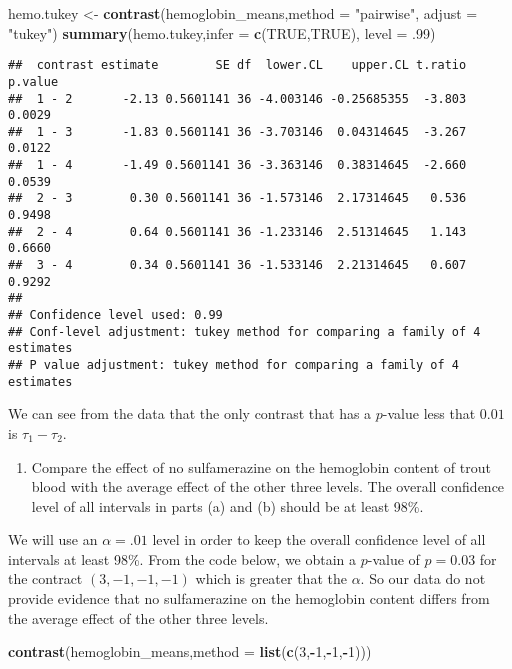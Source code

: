 \documentclass[12pt,]{article}
\newenvironment{Shaded}{\begin{snugshade}}{\end{snugshade}}
\newcommand{\KeywordTok}[1]{\textcolor[rgb]{0.13,0.29,0.53}{\textbf{#1}}}
\newcommand{\DataTypeTok}[1]{\textcolor[rgb]{0.13,0.29,0.53}{#1}}
\newcommand{\DecValTok}[1]{\textcolor[rgb]{0.00,0.00,0.81}{#1}}
\newcommand{\StringTok}[1]{\textcolor[rgb]{0.31,0.60,0.02}{#1}}
\newcommand{\OtherTok}[1]{\textcolor[rgb]{0.56,0.35,0.01}{#1}}
\newcommand{\OperatorTok}[1]{\textcolor[rgb]{0.81,0.36,0.00}{\textbf{#1}}}
\newcommand{\NormalTok}[1]{#1}
\providecommand{\tightlist}{%
  \setlength{\itemsep}{0pt}\setlength{\parskip}{0pt}}
\begin{document}
\begin{Shaded}
\begin{Highlighting}[]
\NormalTok{hemo.tukey <-}\StringTok{ }\KeywordTok{contrast}\NormalTok{(hemoglobin_means,}\DataTypeTok{method =} \StringTok{"pairwise"}\NormalTok{, }\DataTypeTok{adjust =} \StringTok{"tukey"}\NormalTok{)}
\KeywordTok{summary}\NormalTok{(hemo.tukey,}\DataTypeTok{infer =} \KeywordTok{c}\NormalTok{(}\OtherTok{TRUE}\NormalTok{,}\OtherTok{TRUE}\NormalTok{), }\DataTypeTok{level =}\NormalTok{ .}\DecValTok{99}\NormalTok{)}
\end{Highlighting}
\end{Shaded}

\begin{verbatim}
##  contrast estimate        SE df  lower.CL    upper.CL t.ratio p.value
##  1 - 2       -2.13 0.5601141 36 -4.003146 -0.25685355  -3.803  0.0029
##  1 - 3       -1.83 0.5601141 36 -3.703146  0.04314645  -3.267  0.0122
##  1 - 4       -1.49 0.5601141 36 -3.363146  0.38314645  -2.660  0.0539
##  2 - 3        0.30 0.5601141 36 -1.573146  2.17314645   0.536  0.9498
##  2 - 4        0.64 0.5601141 36 -1.233146  2.51314645   1.143  0.6660
##  3 - 4        0.34 0.5601141 36 -1.533146  2.21314645   0.607  0.9292
## 
## Confidence level used: 0.99 
## Conf-level adjustment: tukey method for comparing a family of 4 estimates 
## P value adjustment: tukey method for comparing a family of 4 estimates
\end{verbatim}

We can see from the data that the only contrast that has a \(p\)-value
less that \(0.01\) is \(\tau_1-\tau_2\).

\begin{enumerate}
\def\labelenumi{(\alph{enumi})}
\setcounter{enumi}{1}
\tightlist
\item
  Compare the effect of no sulfamerazine on the hemoglobin content of
  trout blood with the average effect of the other three levels. The
  overall confidence level of all intervals in parts (a) and (b) should
  be at least 98\%.
\end{enumerate}

We will use an \(\alpha = .01\) level in order to keep the overall
confidence level of all intervals at least 98\%. From the code below, we
obtain a \(p\)-value of \(p=0.03\) for the contract \((3,-1,-1,-1)\)
which is greater that the \(\alpha\). So our data do not provide
evidence that no sulfamerazine on the hemoglobin content differs from
the average effect of the other three levels.

\begin{Shaded}
\begin{Highlighting}[]
\KeywordTok{contrast}\NormalTok{(hemoglobin_means,}\DataTypeTok{method =} \KeywordTok{list}\NormalTok{(}\KeywordTok{c}\NormalTok{(}\DecValTok{3}\NormalTok{,}\OperatorTok{-}\DecValTok{1}\NormalTok{,}\OperatorTok{-}\DecValTok{1}\NormalTok{,}\OperatorTok{-}\DecValTok{1}\NormalTok{)))}
\end{Highlighting}
\end{Shaded}
\end{document}
